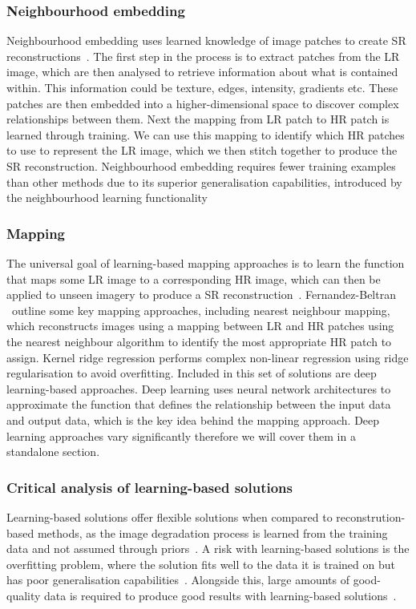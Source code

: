 \subsubsection{Neighbourhood embedding}
Neighbourhood embedding uses learned knowledge of image patches to create SR reconstructions~\cite{neighbourhoodEmbedding}. The first step in the process is to extract patches from the LR image, which are then analysed to retrieve information about what is contained within. This information could be texture, edges, intensity, gradients etc. These patches are then embedded into a higher-dimensional space to discover complex relationships between them. Next the mapping from LR patch to HR patch is learned through training. We can use this mapping to identify which HR patches to use to represent the LR image, which we then stitch together to produce the SR reconstruction. Neighbourhood embedding requires fewer training examples than other methods due to its superior generalisation capabilities, introduced by the neighbourhood learning functionality~\cite{neighbourhoodEmbedding}

\subsubsection{Mapping}
The universal goal of learning-based mapping approaches is to learn the function that maps some LR image to a corresponding HR image, which can then be applied to unseen imagery to produce a SR reconstruction~\cite{superResRemoteSensingOverview}. Fernandez-Beltran \etal\ outline some key mapping approaches, including nearest neighbour mapping, which reconstructs images using a mapping between LR and HR patches using the nearest neighbour algorithm to identify the most appropriate HR patch to assign. Kernel ridge regression performs complex non-linear regression using ridge regularisation to avoid overfitting. Included in this set of solutions are deep learning-based approaches. Deep learning uses neural network architectures to approximate the function that defines the relationship between the input data and output data, which is the key idea behind the mapping approach. Deep learning approaches vary significantly therefore we will cover them in a standalone section.

\subsubsection{Critical analysis of learning-based solutions}
Learning-based solutions offer flexible solutions when compared to reconstrution-based methods, as the image degradation process is learned from the training data and not assumed through priors~\cite{neighbourhoodEmbedding}. A risk with learning-based solutions is the overfitting problem, where the solution fits well to the data it is trained on but has poor generalisation capabilities~\cite{overfitting}. Alongside this, large amounts of good-quality data is required to produce good results with learning-based solutions~\cite{superResRemoteSensingOverview}.

